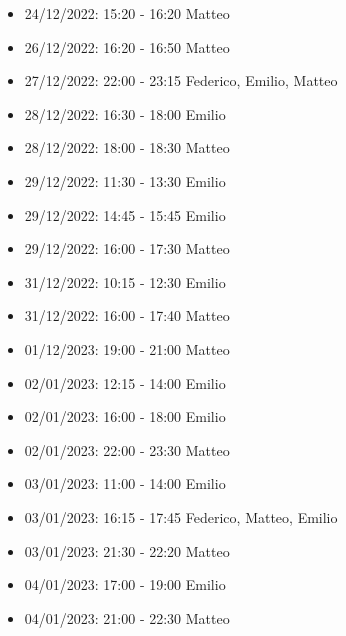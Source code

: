 \begin{itemize}
    \item 24/12/2022: 15:20 - 16:20 Matteo
    \item 26/12/2022: 16:20 - 16:50 Matteo
    \item 27/12/2022: 22:00 - 23:15 Federico, Emilio, Matteo
    \item 28/12/2022: 16:30 - 18:00 Emilio
    \item 28/12/2022: 18:00 - 18:30 Matteo
    \item 29/12/2022: 11:30 - 13:30 Emilio
    \item 29/12/2022: 14:45 - 15:45 Emilio
    \item 29/12/2022: 16:00 - 17:30 Matteo
    \item 31/12/2022: 10:15 - 12:30 Emilio
    \item 31/12/2022: 16:00 - 17:40 Matteo
    \item 01/12/2023: 19:00 - 21:00 Matteo
    \item 02/01/2023: 12:15 - 14:00 Emilio
    \item 02/01/2023: 16:00 - 18:00 Emilio
    \item 02/01/2023: 22:00 - 23:30 Matteo
    \item 03/01/2023: 11:00 - 14:00 Emilio
    \item 03/01/2023: 16:15 - 17:45 Federico, Matteo, Emilio
    \item 03/01/2023: 21:30 - 22:20 Matteo
    \item 04/01/2023: 17:00 - 19:00 Emilio
    \item 04/01/2023: 21:00 - 22:30 Matteo
\end{itemize}
\clearpage